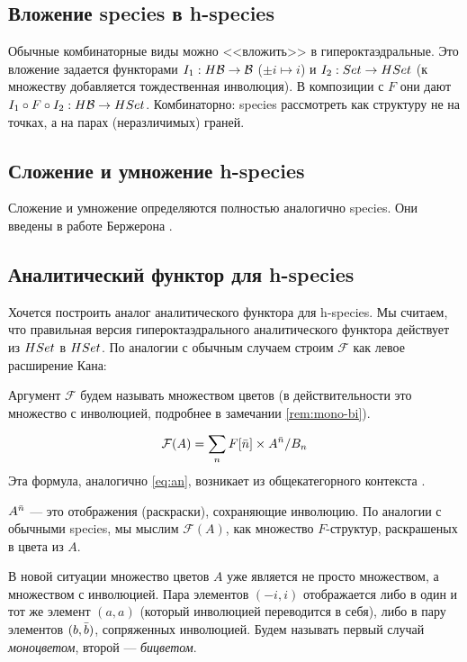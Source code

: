 \subsection{Вложение species в h-species}
Обычные комбинаторные виды можно <<вложить>> в гипероктаэдральные. Это вложение
задается функторами $I_1:H\mathcal B \rightarrow \mathcal B$ ($\pm i \mapsto i$) и $I_2:Set
\rightarrow HSet$ (к множеству добавляется тождественная инволюция).
В композиции с $F$ они дают $I_1 \circ F \circ I_2 : H\mathcal B \rightarrow HSet$.
Комбинаторно: species рассмотреть как структуру не на точках, а на
парах (неразличимых) граней.

\subsection{Сложение и умножение h-species}
Сложение и умножение определяются полностью аналогично species. Они введены в
работе Бержерона \cite{BergH}.

\subsection{Аналитический функтор для h-species}
Хочется построить аналог аналитического функтора для h-species. Мы считаем, что
правильная версия гипероктаэдрального аналитического функтора действует из
$HSet$ в $HSet$. По аналогии с обычным случаем строим $\mathcal F$ как левое
расширение Кана:


Аргумент $\mathcal F$ будем называть множеством цветов (в действительности это
множество с инволюцией, подробнее в замечании \ref{rem:mono-bi}).

\begin{equation}
\label{eq:h-an}
	\mathcal F(A) = \sum\limits_n F[\Bar n] \times A^{\Bar n} / B_n
\end{equation}
Эта формула, аналогично \ref{eq:an}, возникает из общекатегорного контекста
\cite{DoldKan}.

$A^{\Bar n}$ --- это отображения (раскраски), сохраняющие инволюцию. По
аналогии с обычными species, мы мыслим $\mathcal F(A)$, как множество
$F$-структур, раскрашеных в цвета из $A$.
\begin{remark}
\label{rem:mono-bi}
В новой ситуации множество цветов $A$ уже является не просто множеством, а
множеством с инволюцией. Пара элементов $(-i, i)$ отображается либо
в один и тот же элемент $(a, a)$ (который инволюцией переводится в себя), либо
в пару элементов $(b, \Bar b)$, сопряженных инволюцией. Будем называть первый
случай \emph{моноцветом}, второй --- \emph{бицветом}.
\end{remark}

